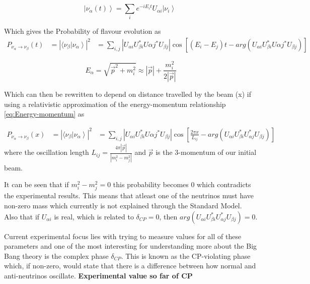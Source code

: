 \begin{equation}
\label{eq:eigenstatesTime}
 \left| \nu_\alpha (t) \right\rangle = \sum_{i} e^{-i E_i t} U_{\alpha i} \left| \nu_i \right\rangle\
 \end{equation}

Which gives the Probability of flavour evolution as 
\begin{equation}
\begin{aligned}
P_{\nu_\alpha \rightarrow \nu_\beta} (t) &= \left|  \langle \nu_\beta \left| \nu_\alpha     \right\rangle  \right|^2
& = \sum_{i,j} \left| U_{\alpha i} U_{\beta i}^* U{\alpha j}^* U_{\beta j} \right| \cos[(E_i - E_j)t -arg(U_{\alpha i} U_{\beta i}^* U{\alpha j}^* U_{\beta j} ) ]
\end{aligned}
\end{equation}

\begin{equation}
\label{eq:Energy-momentum}
E_\alpha = \sqrt{\vec{p}^2 + m_i^2} \approx \left| \vec{p} \right| + \frac{m_i^2}{2\left| \vec{p} \right|}
\end{equation}

Which can then be rewritten to depend on distance travelled by the beam (x) if using a relativistic approximation of the  energy-momentum relationship \ref{eq:Energy-momentum} as

\begin{equation}
\label{eq:Problength}
\begin{aligned}
P_{\nu_\alpha \rightarrow \nu_\beta} (x) &= \left|  \langle \nu_\beta \left| \nu_\alpha     \right\rangle  \right|^2
& = \sum_{i,j} \left| U_{\alpha i} U_{\beta i}^* U{\alpha j}^* U_{\beta j} \right| \cos[\frac{2\pi x}{L_{ij}} -arg(U_{\alpha i} U_{\beta i}^* U_{\alpha j}^* U_{\beta j} ) ]
\end{aligned}
\end{equation}
where the oscillation length $L_{ij} = \frac{4\pi  \left| \vec{p} \right| }{\left| m_i^2 - m_j^2 \right|}$ and $\vec{p}$ is the 3-momentum of our initial beam.

It can be seen that if $m_i^2 - m_j^2 = 0 $ this probability becomes $0$ which contradicts the experimental results. This means that atleast one of the neutrinos must have non-zero mass which currently is not explained through the Standard Model. Also that if $U_{\alpha i}$ is real, which is related to $\delta_{CP} = 0$, then $arg(U_{\alpha i} U_{\beta i}^* U_{\alpha j}^* U_{\beta j} ) = 0$.

Current experimental focus lies with trying to measure values for all of these parameters and one of the most interesting for understanding more about the Big Bang theory is the complex phase $\delta_{CP}$. This is known as the CP-violating phase which, if non-zero, would state that there is a difference between how normal and anti-neutrinos oscillate. \textbf{Experimental value so far of CP}

